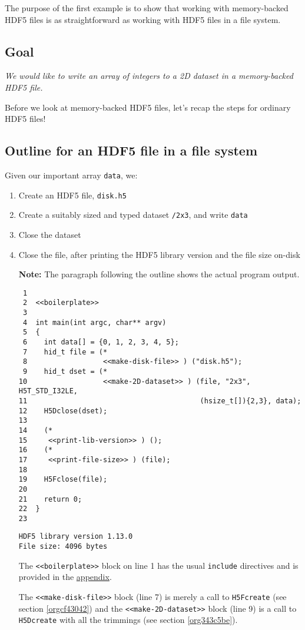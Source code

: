 \documentclass[a4paper, 12pt]{article}
\begin{document}
The purpose of the first example is to show that working with memory-backed
HDF5 files is as straightforward as working with HDF5 files in a file system.

\subsection{Goal}
\label{sec:orgebcb91a}

\emph{We would like to write an array of integers to a 2D dataset in a
memory-backed HDF5 file.}

Before we look at memory-backed HDF5 files, let's recap the steps for
ordinary HDF5 files!

\subsection{Outline for an HDF5 file in a file system}
\label{sec:orgee51764}

Given our important array \texttt{data}, we:
\begin{enumerate}
\item Create an HDF5 file, \texttt{disk.h5}
\item Create a suitably sized and typed dataset \texttt{/2x3}, and write \texttt{data}
\item Close the dataset
\item Close the file, after printing the HDF5 library version and the file size
on-disk

\textbf{\textbf{Note:}} The paragraph following the outline shows the actual program
output.

\begin{verbatim}
 1
 2  <<boilerplate>>
 3
 4  int main(int argc, char** argv)
 5  {
 6    int data[] = {0, 1, 2, 3, 4, 5};
 7    hid_t file = (*
 8                  <<make-disk-file>> ) ("disk.h5");
 9    hid_t dset = (*
10                  <<make-2D-dataset>> ) (file, "2x3", H5T_STD_I32LE,
11                                         (hsize_t[]){2,3}, data);
12    H5Dclose(dset);
13
14    (*
15     <<print-lib-version>> ) ();
16    (*
17     <<print-file-size>> ) (file);
18
19    H5Fclose(file);
20
21    return 0;
22  }
23
\end{verbatim}

\begin{verbatim}
HDF5 library version 1.13.0
File size: 4096 bytes
\end{verbatim}

The \texttt{<<boilerplate>>} block on line 1 has the usual \texttt{include}
directives and is provided in the \hyperref[sec:org77e4cdd]{appendix}.

The \texttt{<<make-disk-file>>} block (line 7) is merely a call to
\texttt{H5Fcreate} (see section \ref{orgcf43042}) and the
\texttt{<<make-2D-dataset>>} block (line 9) is a call to \texttt{H5Dcreate} with
all the trimmings (see section \ref{org343c5be}).
\end{enumerate}
\end{document}
